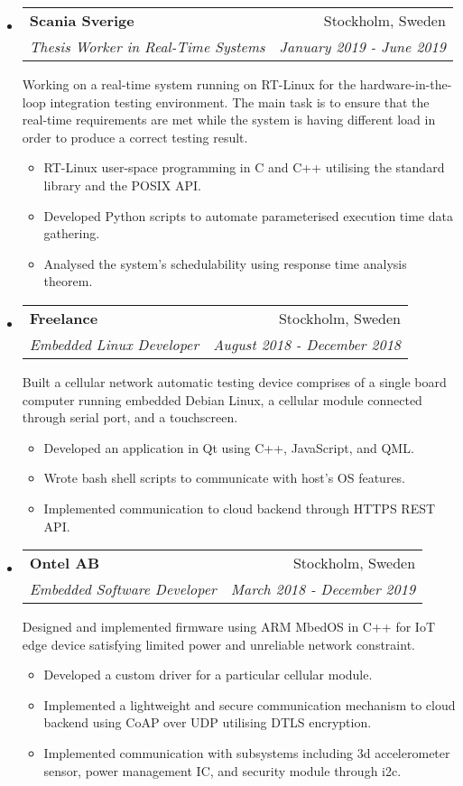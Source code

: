 \documentclass[letterpaper,10pt]{article}
\makeatletter
\newcommand{\resitem}[1]{\item #1 \vspace{-2pt}}
\newcommand{\ressubheadingwithtext}[4]{
\begin{tabular*}{6.5in}{l@{\cftdotfill{\cftsecdotsep}\extracolsep{\fill}}r}
		\textbf{#1} & #2 \\
        \textit{#3} & \textit{#4} \\
\end{tabular*}\vspace{2pt}}
\newcommand{\ressubheadingtext}[1]{
    \textnormal{#1}\vspace{-6pt}
}
\makeatother
\begin{document}
\begin{itemize}

\item
    \ressubheadingwithtext{Scania Sverige}{Stockholm, Sweden}{Thesis Worker in Real-Time Systems}{January 2019 - June 2019}
    \ressubheadingtext{Working on a real-time system running on RT-Linux for the hardware-in-the-loop integration testing environment. The main task is to ensure that the real-time requirements are met while the system is having different load in order to produce a correct testing result.}
	\begin{itemize}
      \resitem{RT-Linux user-space programming in C and C++ utilising the standard library and the POSIX API.}
      \resitem{Developed Python scripts to automate parameterised execution time data gathering.}
      \resitem{Analysed the system's schedulability using response time analysis theorem.}
	\end{itemize}

\item
    \ressubheadingwithtext{Freelance}{Stockholm, Sweden}{Embedded Linux Developer}{August 2018 - December 2018}
    \ressubheadingtext{Built a cellular network automatic testing device comprises of a single board computer running embedded Debian Linux, a cellular module connected through serial port, and a touchscreen.}
	\begin{itemize}
        \resitem{Developed an application in Qt using C++, JavaScript, and QML.}
        \resitem{Wrote bash shell scripts to communicate with host's OS features.}
        \resitem{Implemented communication to cloud backend through HTTPS REST API.}
	\end{itemize}

\item
    \ressubheadingwithtext{Ontel AB}{Stockholm, Sweden}{Embedded Software Developer}{March 2018 - December 2019}
    \ressubheadingtext{Designed and implemented firmware using ARM MbedOS in C++ for IoT edge device satisfying limited power and unreliable network constraint.}
    \begin{itemize}
        \resitem{Developed a custom driver for a particular cellular module.}
        \resitem{Implemented a lightweight and secure communication mechanism to cloud backend using CoAP over UDP utilising DTLS encryption.}
        \resitem{Implemented communication with subsystems including 3d accelerometer sensor, power management IC, and security module through i2c.}
    \end{itemize}


\end{itemize}
\end{document}
